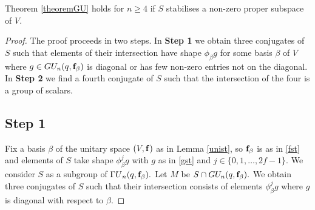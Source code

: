 \begin{Th}
\label{lem421}
Theorem {\rm \ref{theoremGU}} holds for  $n \ge 4$ if $S$ stabilises a non-zero proper subspace of $V$. 
\end{Th}
\begin{proof}
The proof proceeds in two steps. In {\bf Step 1} we obtain three conjugates of $S$ such that elements of their intersection have shape $\phi_{\beta} g$ for some basis $\beta$ of $V$ where $g \in GU_n(q, {\bf f}_{\beta})$ is diagonal or has  few non-zero entries not on the diagonal. In {\bf Step 2} we find a fourth conjugate of $S$ such that the intersection of the four is a group of scalars.

\subsection*{Step 1} 
 Fix a basis $\beta$ of the unitary space $(V, {\bf f})$ as in Lemma \ref{unist}, so ${\bf f}_{\beta}$ is as in \eqref{fst} and elements of $S$ take shape $\phi_{\beta}^{j}g$ with $g$ as in \eqref{gst} and $j \in \{0, 1, \ldots, 2f-1\}$. We consider $S$ as a subgroup of ${{\Gamma U}}_n(q,{\bf f}_{\beta}).$ Let $M$ be $S \cap GU_n(q,{\bf f}_{\beta}).$  We obtain three conjugates of $S$ such that their intersection consists of elements $\phi_{\beta}^{j}g$ where $g$ is diagonal with respect to $\beta.$





\end{proof}
